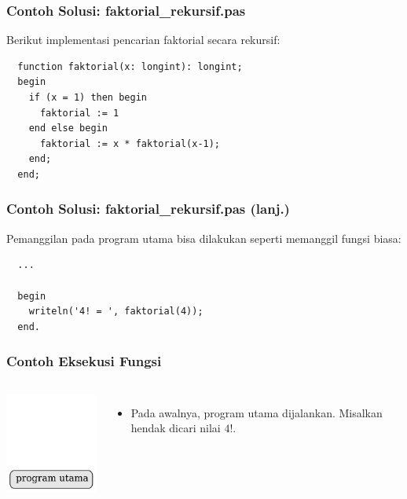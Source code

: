 \begin{frame}[fragile]
\frametitle{Contoh Solusi: faktorial\_rekursif.pas}
Berikut implementasi pencarian faktorial secara rekursif:
\begin{lstlisting}
  function faktorial(x: longint): longint;
  begin
    if (x = 1) then begin
      faktorial := 1
    end else begin
      faktorial := x * faktorial(x-1); 
    end;
  end;
\end{lstlisting}
\end{frame}

\begin{frame}[fragile]
\frametitle{Contoh Solusi: faktorial\_rekursif.pas (lanj.)}
Pemanggilan pada program utama bisa dilakukan seperti memanggil fungsi biasa:
\begin{lstlisting}
  ...
  
  begin
    writeln('4! = ', faktorial(4));
  end.
\end{lstlisting}
\end{frame}

\begin{frame}
\frametitle{Contoh Eksekusi Fungsi}
\begin{columns}
    \centering
    \includegraphics[width=4cm]{asset/rekursi-1.pdf}
    \begin{itemize}
      \item Pada awalnya, program utama dijalankan. Misalkan hendak dicari nilai $4!$.
    \end{itemize} 
  \end{columns} 
\end{frame}

